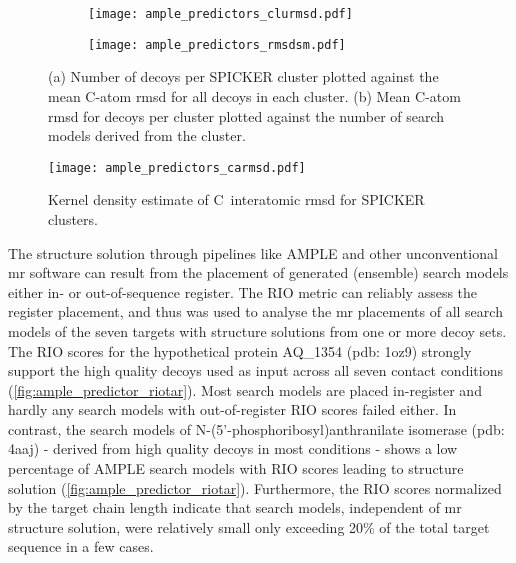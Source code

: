 \begin{figure}[H]
    \centering
    \begin{subfigure}[b]{\textwidth}
        \texttt{[image: ample\_predictors\_clurmsd.pdf]}
        \caption{}
        \label{fig:ample_predictor_clurmsd}
    \end{subfigure}
    \begin{subfigure}[b]{\textwidth}
        \texttt{[image: ample\_predictors\_rmsdsm.pdf]}
        \caption{}
        \label{fig:ample_predictor_rmsdsm}
    \end{subfigure}

    \caption{(a) Number of decoys per SPICKER cluster plotted against the mean C\textalpha-atom \gls{rmsd} for all decoys in each cluster. (b) Mean C\textalpha-atom \gls{rmsd} for decoys per cluster plotted against the number of search models derived from the cluster.}
\end{figure}

\begin{figure}[H]
    \centering
    \texttt{[image: ample\_predictors\_carmsd.pdf]}
    \caption{Kernel density estimate of C\textalpha\ interatomic \gls{rmsd} for SPICKER clusters.}
    \label{fig:ample_predictor_carmsd}
\end{figure}

The structure solution through pipelines like AMPLE and other unconventional \gls{mr} software \cite{Rodriguez2009-tk, Sammito2013-tt} can result from the placement of generated (ensemble) search models either in- or out-of-sequence register. The RIO metric \cite{Thomas2015-ag} can reliably assess the register placement, and thus was used to analyse the \gls{mr} placements of all search models of the seven targets with structure solutions from one or more decoy sets. The RIO scores for the hypothetical protein AQ\_1354 (\gls{pdb}: 1oz9) strongly support the high quality decoys used as input across all seven contact conditions (\cref{fig:ample_predictor_riotar}). Most search models are placed in-register and hardly any search models with out-of-register RIO scores failed either. In contrast, the search models of N-(5’-phosphoribosyl)anthranilate isomerase (\gls{pdb}: 4aaj) - derived from high quality decoys in most conditions - shows a low percentage of AMPLE search models with RIO scores leading to structure solution (\cref{fig:ample_predictor_riotar}). Furthermore, the RIO scores normalized by the target chain length indicate that search models, independent of \gls{mr} structure solution, were relatively small only exceeding 20\% of the total target sequence in a few cases. 

